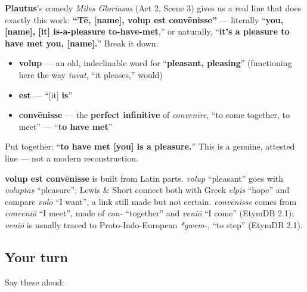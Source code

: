 \begin{culture}
\textbf{Plautus}'s comedy \emph{Miles Gloriosus} (Act 2, Scene 3) gives us a real line that does exactly this work: \textbf{\textquotedblleft{}Tē, {[}name{]}, volup est convēnisse\textquotedblright{}} — literally \textquotedblleft{}\textbf{you, {[}name{]}, {[}it{]} is-a-pleasure to-have-met},\textquotedblright{} or naturally, \textquotedblleft{}\textbf{it's a pleasure to have met you, {[}name{]}.}\textquotedblright{} Break it down:

\begin{itemize}
\raggedright
  \item \textbf{volup} — an old, indeclinable word for \textquotedblleft{}\textbf{pleasant, pleasing}\textquotedblright{} (functioning here the way \emph{iuvat}, \textquotedblleft{}it pleases,\textquotedblright{} would)
  \item \textbf{est} — \textquotedblleft{}{[}it{]} \textbf{is}\textquotedblright{}
  \item \textbf{convēnisse} — the \textbf{perfect infinitive} of \emph{convenīre}, \textquotedblleft{}to come together, to meet\textquotedblright{} — \textquotedblleft{}\textbf{to have met}\textquotedblright{}
\end{itemize}

Put together: \textquotedblleft{}\textbf{to have met {[}you{]} is a pleasure.}\textquotedblright{} This is a genuine, attested line — not a modern reconstruction.
\end{culture}

\begin{cousinweb}
\textbf{volup est convēnisse} is built from Latin parts. \emph{volup} \textquotedblleft{}pleasant\textquotedblright{} goes with \emph{voluptās} \textquotedblleft{}pleasure\textquotedblright{}; Lewis \& Short connect both with Greek \emph{elpis} \textquotedblleft{}hope\textquotedblright{} and compare \emph{volō} \textquotedblleft{}I want\textquotedblright{}, a link still made but not certain. \emph{convēnisse} comes from \emph{conveniō} \textquotedblleft{}I meet\textquotedblright{}, made of \emph{con-} \textquotedblleft{}together\textquotedblright{} and \emph{veniō} \textquotedblleft{}I come\textquotedblright{} (EtymDB 2.1); \emph{veniō} is usually traced to Proto-Indo-European \emph{*gwem-}, \textquotedblleft{}to step\textquotedblright{} (EtymDB 2.1).
\end{cousinweb}

\subsection*{Your turn}
Say these aloud:

